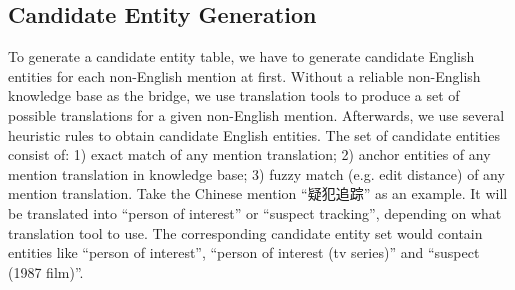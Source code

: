 \subsection{Candidate Entity Generation}
\label{sec:candgen}
To generate a candidate entity table, we have to generate candidate English 
entities for each non-English mention at first. Without a reliable 
non-English knowledge base as the bridge, we use translation tools to 
produce a set of possible translations for a given non-English mention. 
Afterwards, we use several heuristic rules to obtain candidate English 
entities. The set of candidate entities consist of:  1) exact match of 
any mention translation; 2) anchor entities of any mention translation in 
knowledge base; 3) fuzzy match (e.g. edit distance) of any mention translation. 
Take the Chinese mention ``疑犯追踪'' as an example. It will be translated 
into ``person of interest'' or  ``suspect tracking'', depending on 
what translation tool to use. The corresponding candidate entity set 
would contain entities like ``person of interest'', 
``person of interest (tv series)'' and ``suspect (1987 film)''.
